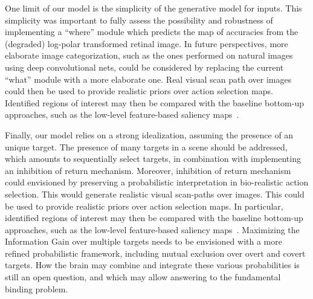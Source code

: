 One limit of our model is the simplicity of the generative model for inputs. This simplicity was important to fully assess the possibility and robustness of implementing a ``where'' module which predicts the map of accuracies from the (degraded) log-polar transformed retinal image.
In future perspectives, more elaborate image categorization, such as the ones performed on natural images using deep convolutional nets, could be considered by replacing the current ``what'' module with a more elaborate one. 
Real visual scan path over images could then be used to provide realistic priors over action selection maps.  %
Identified regions of interest may then be compared with the baseline bottom-up approaches, such as the low-level feature-based saliency maps~\citep{Itti01}. 

Finally, our model relies on a strong idealization, assuming the presence of an unique target. The presence of many targets in a scene should be addressed, which amounts to sequentially select targets, in combination with implementing an inhibition of return mechanism. Moreover, inhibition of return mechanism could envisioned by preserving a probabilistic interpretation in bio-realistic action selection. This would generate realistic visual scan-paths over images. This could be used to provide realistic priors over action selection maps.  In particular, identified regions of interest may then be compared with the baseline bottom-up approaches, such as the low-level feature-based saliency maps~\citep{Itti01}. Maximizing the Information Gain over multiple targets needs to be envisioned with a more refined probabilistic framework, including mutual exclusion over overt and covert targets. How the brain may combine and integrate these various probabilities is still an open question, and which may allow answering to the fundamental binding problem. %

